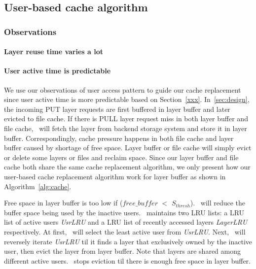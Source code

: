 \subsection{User-based cache algorithm}

\subsubsection{Observations}


\paragraph{Layer reuse time varies a lot}

\paragraph{User active time is predictable}



We use our observations of user access pattern to guide our cache replacement
since user active time is more predictable based on Section~\ref{xxx}.
In~\cref{sec:design}, the incoming PUT layer requests are first buffered in layer buffer and later evicted to file cache.
If there is PULL layer request miss in both layer buffer and file cache, 
\sysname~will fetch the layer from backend storage system and store it in layer buffer.
Correspondingly, cache pressure happens in both file cache and layer buffer caused by shortage of free space.
Layer buffer or file cache will simply evict or delete some layers or files and reclaim space.
Since our layer buffer and file cache both share the same cache replacement algorithm, we only present
how our user-based cache replacement algorithm work for layer buffer as shown in Algorithm~\ref{alg:cache}.

Free space in layer buffer is too low if ($free\_buffer$ $<$ $S_{thresh}$). 
\sysname~will reduce the buffer space being used by the inactive users. 
\sysname~maintains two LRU lists: a LRU list of active users \emph{UsrLRU} and
a LRU list of recently accessed layers \emph{LayerLRU} respectively.
At first, \sysname~will select the least active user from \emph{UsrLRU}.
Next, \sysname~will reversely iterate \emph{UsrLRU} til it finds a layer that exclusively owned by the inactive user, 
then evict the layer from layer buffer. 
 Note that layers are shared among different active users.
 \sysname~stops eviction til there is enough free space in layer buffer.
 


